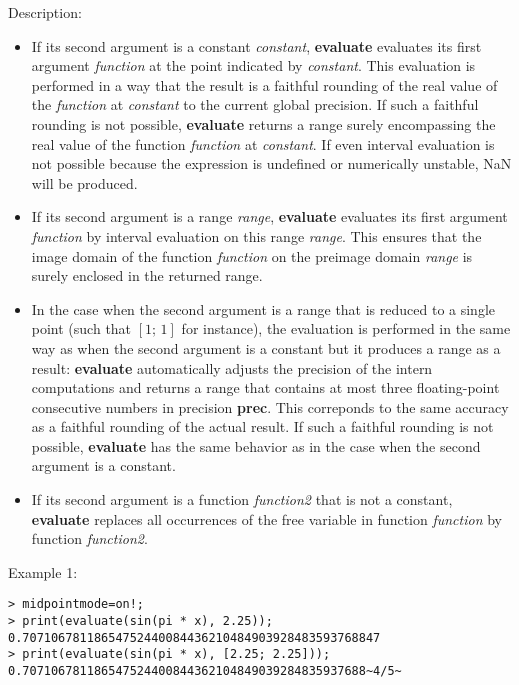 \noindent Description: \begin{itemize}

\item If its second argument is a constant \emph{constant}, \textbf{evaluate} evaluates
   its first argument \emph{function} at the point indicated by
   \emph{constant}. This evaluation is performed in a way that the result is a
   faithful rounding of the real value of the \emph{function} at \emph{constant} to
   the current global precision. If such a faithful rounding is not
   possible, \textbf{evaluate} returns a range surely encompassing the real value
   of the function \emph{function} at \emph{constant}. If even interval evaluation
   is not possible because the expression is undefined or numerically
   unstable, NaN will be produced.

\item If its second argument is a range \emph{range}, \textbf{evaluate} evaluates its
   first argument \emph{function} by interval evaluation on this range
   \emph{range}. This ensures that the image domain of the function \emph{function}
   on the preimage domain \emph{range} is surely enclosed in the returned
   range.

\item In the case when the second argument is a range that is reduced to a
   single point (such that $[1;\,1]$ for instance), the evaluation
   is performed in the same way as when the second argument is a constant but
   it produces a range as a result: \textbf{evaluate} automatically adjusts the precision
   of the intern computations and returns a range that contains at most three floating-point
   consecutive numbers in precision \textbf{prec}. This correponds to the same accuracy
   as a faithful rounding of the actual result. If such a faithful rounding
   is not possible, \textbf{evaluate} has the same behavior as in the case when the
   second argument is a constant.

\item If its second argument is a function \emph{function2} that is not a
   constant, \textbf{evaluate} replaces all occurrences of the free variable in
   function \emph{function} by function \emph{function2}.
\end{itemize}
\noindent Example 1: 
\begin{center}\begin{minipage}{15cm}\begin{Verbatim}[frame=single]
> midpointmode=on!;
> print(evaluate(sin(pi * x), 2.25));
0.70710678118654752440084436210484903928483593768847
> print(evaluate(sin(pi * x), [2.25; 2.25]));
0.707106781186547524400844362104849039284835937688~4/5~
\end{Verbatim}
\end{minipage}\end{center}
